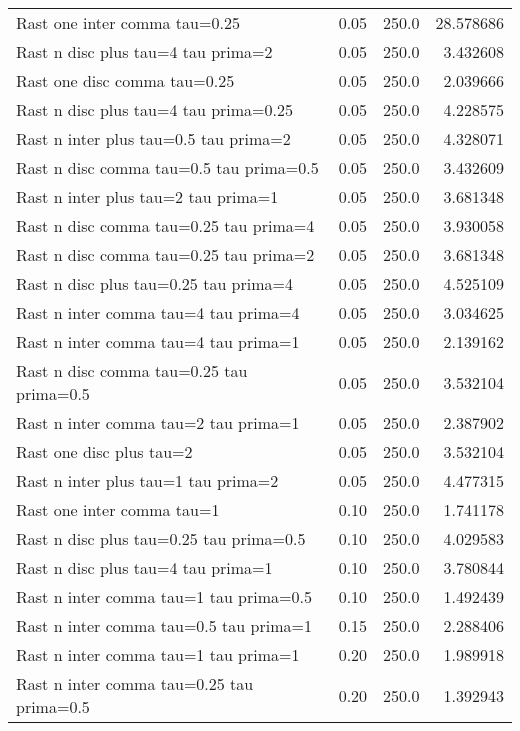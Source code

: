 \documentclass[11pt]{article}
\begin{document}
\begin{tabular}{lrrr}
Rast one inter comma tau=0.25              &  0.05 &  250.0 &  28.578686 \\
Rast n disc  plus  tau=4 tau prima=2       &  0.05 &  250.0 &   3.432608 \\
Rast one disc  comma tau=0.25              &  0.05 &  250.0 &   2.039666 \\
Rast n disc  plus  tau=4 tau prima=0.25    &  0.05 &  250.0 &   4.228575 \\
Rast n inter plus  tau=0.5 tau prima=2     &  0.05 &  250.0 &   4.328071 \\
Rast n disc  comma tau=0.5 tau prima=0.5   &  0.05 &  250.0 &   3.432609 \\
Rast n inter plus  tau=2 tau prima=1       &  0.05 &  250.0 &   3.681348 \\
Rast n disc  comma tau=0.25 tau prima=4    &  0.05 &  250.0 &   3.930058 \\
Rast n disc  comma tau=0.25 tau prima=2    &  0.05 &  250.0 &   3.681348 \\
Rast n disc  plus  tau=0.25 tau prima=4    &  0.05 &  250.0 &   4.525109 \\
Rast n inter comma tau=4 tau prima=4       &  0.05 &  250.0 &   3.034625 \\
Rast n inter comma tau=4 tau prima=1       &  0.05 &  250.0 &   2.139162 \\
Rast n disc  comma tau=0.25 tau prima=0.5  &  0.05 &  250.0 &   3.532104 \\
Rast n inter comma tau=2 tau prima=1       &  0.05 &  250.0 &   2.387902 \\
Rast one disc  plus  tau=2                 &  0.05 &  250.0 &   3.532104 \\
Rast n inter plus  tau=1 tau prima=2       &  0.05 &  250.0 &   4.477315 \\
Rast one inter comma tau=1                 &  0.10 &  250.0 &   1.741178 \\
Rast n disc  plus  tau=0.25 tau prima=0.5  &  0.10 &  250.0 &   4.029583 \\
Rast n disc  plus  tau=4 tau prima=1       &  0.10 &  250.0 &   3.780844 \\
Rast n inter comma tau=1 tau prima=0.5     &  0.10 &  250.0 &   1.492439 \\
Rast n inter comma tau=0.5 tau prima=1     &  0.15 &  250.0 &   2.288406 \\
Rast n inter comma tau=1 tau prima=1       &  0.20 &  250.0 &   1.989918 \\
Rast n inter comma tau=0.25 tau prima=0.5  &  0.20 &  250.0 &   1.392943 \\

\end{tabular}
\end{document}
